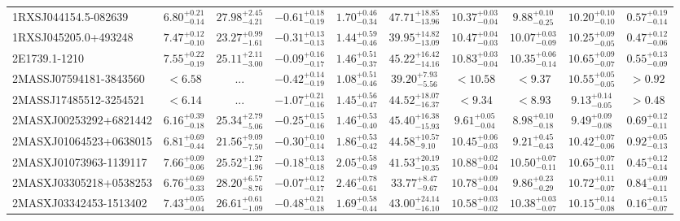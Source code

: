 \documentclass[onecolumn]{mn2e}
\begin{document}
\begin{landscape}
{\begin{center}
\begin{longtable}{lccccccccc}
\hline \hline
\endfoot
1RXSJ044154.5-082639 & $6.80_{-0.14}^{+0.21}$ & $27.98_{-4.21}^{+2.45}$ & $-0.61_{-0.19}^{+0.18}$ & $1.70_{-0.34}^{+0.46}$ &$47.71_{-13.96}^{+18.85}$ & $10.37_{-0.04}^{+0.03}$ & $9.88_{-0.25}^{+0.10}$ & $10.20_{-0.10}^{+0.10}$ & $0.57_{-0.14}^{+0.19}$ \\
1RXSJ045205.0+493248 & $7.47_{-0.10}^{+0.12}$ & $23.27_{-1.61}^{+0.99}$ & $-0.31_{-0.13}^{+0.13}$ & $1.44_{-0.46}^{+0.59}$ &$39.95_{-13.09}^{+14.82}$ & $10.47_{-0.03}^{+0.04}$ & $10.07_{-0.09}^{+0.03}$ & $10.25_{-0.05}^{+0.09}$ & $0.47_{-0.06}^{+0.12}$ \\
2E1739.1-1210 & $7.55_{-0.19}^{+0.22}$ & $25.11_{-3.00}^{+2.11}$ & $-0.09_{-0.17}^{+0.16}$ & $1.46_{-0.37}^{+0.51}$ &$45.22_{-14.16}^{+16.42}$ & $10.83_{-0.04}^{+0.03}$ & $10.35_{-0.14}^{+0.06}$ & $10.65_{-0.07}^{+0.09}$ & $0.55_{-0.09}^{+0.13}$ \\
2MASSJ07594181-3843560 & $<6.58$ & ... & $-0.42_{-0.19}^{+0.14}$ & $1.08_{-0.46}^{+0.51}$ &$39.20_{-5.56}^{+7.93}$ & $<10.58$ & $<9.37$ & $10.55_{-0.05}^{+0.05}$ & $>0.92$ \\
2MASSJ17485512-3254521 & $<6.14$ & ... & $-1.07_{-0.16}^{+0.21}$ & $1.45_{-0.47}^{+0.56}$ &$44.52_{-16.37}^{+18.07}$ & $<9.34$ & $<8.93$ & $9.13_{-0.05}^{+0.14}$ & $>0.48$ \\
2MASXJ00253292+6821442 & $6.16_{-0.18}^{+0.39}$ & $25.34_{-5.06}^{+2.79}$ & $-0.25_{-0.16}^{+0.15}$ & $1.46_{-0.40}^{+0.53}$ &$45.40_{-15.93}^{+16.38}$ & $9.61_{-0.04}^{+0.05}$ & $8.98_{-0.18}^{+0.10}$ & $9.49_{-0.08}^{+0.09}$ & $0.69_{-0.11}^{+0.12}$ \\
2MASXJ01064523+0638015 & $6.81_{-0.44}^{+0.69}$ & $21.56_{-7.50}^{+9.09}$ & $-0.30_{-0.14}^{+0.10}$ & $1.86_{-0.42}^{+0.53}$ &$44.58_{-9.10}^{+10.57}$ & $10.45_{-0.03}^{+0.06}$ & $9.21_{-0.43}^{+0.45}$ & $10.42_{-0.06}^{+0.07}$ & $0.92_{-0.13}^{+0.05}$ \\
2MASXJ01073963-1139117 & $7.66_{-0.06}^{+0.09}$ & $25.52_{-1.96}^{+1.27}$ & $-0.18_{-0.18}^{+0.13}$ & $2.05_{-0.49}^{+0.58}$ &$41.53_{-10.35}^{+20.19}$ & $10.88_{-0.04}^{+0.02}$ & $10.50_{-0.11}^{+0.07}$ & $10.65_{-0.11}^{+0.07}$ & $0.45_{-0.14}^{+0.12}$ \\
2MASXJ03305218+0538253 & $6.76_{-0.33}^{+0.69}$ & $28.20_{-8.76}^{+6.57}$ & $-0.07_{-0.17}^{+0.12}$ & $2.46_{-0.61}^{+0.78}$ &$33.77_{-9.67}^{+8.47}$ & $10.78_{-0.04}^{+0.09}$ & $9.86_{-0.29}^{+0.23}$ & $10.72_{-0.07}^{+0.11}$ & $0.84_{-0.11}^{+0.09}$ \\
2MASXJ03342453-1513402 & $7.43_{-0.04}^{+0.05}$ & $26.61_{-1.09}^{+0.61}$ & $-0.48_{-0.18}^{+0.21}$ & $1.69_{-0.44}^{+0.58}$ &$43.00_{-16.10}^{+24.14}$ & $10.58_{-0.02}^{+0.03}$ & $10.38_{-0.07}^{+0.03}$ & $10.15_{-0.08}^{+0.14}$ & $0.16_{-0.07}^{+0.15}$ \\

\end{longtable}
\end{center}}
\end{landscape}
\end{document}
